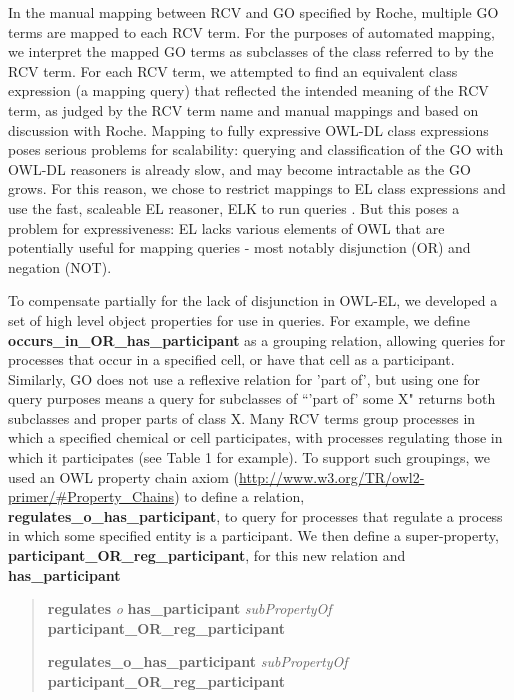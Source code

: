 \documentclass[runningheads,a4paper]{llncs}
\begin{document}
{{In the manual mapping between RCV and \ac{GO} specified by Roche, multiple \ac{GO} terms are mapped to each RCV term. For the purposes of automated mapping, we interpret the mapped \ac{GO} terms as subclasses of the class referred to by the RCV term. For each RCV term, we attempted to find an equivalent class expression (a mapping query) that reflected the intended meaning of the RCV term, as judged by the RCV term name and manual mappings and based on discussion with Roche.
%
Mapping to fully expressive OWL-DL class expressions poses serious problems for scalability: querying and classification of the \ac{GO} with OWL-DL reasoners is already slow, and may become intractable as the \ac{GO} grows.  For this reason, we chose to restrict mappings to EL class expressions and use the fast, scaleable EL reasoner, ELK to run queries \cite{kazakov2012}. But this poses a problem for expressiveness: EL lacks various elements of OWL that are potentially useful for mapping queries - most notably disjunction (OR) and negation (NOT).  

To compensate partially for the lack of disjunction in OWL-EL, we developed a set of high level object properties for use in queries. For example, we define \textbf{occurs\_in\_OR\_has\_participant} as a grouping relation, allowing queries for processes that occur in a specified cell, or have that cell as a participant. Similarly, \ac{GO} does not use a reflexive relation for 'part of', but using one for query purposes means a query for subclasses of  ``'part of' some X" returns both subclasses and proper parts of class X.
%
Many RCV terms group processes in which a specified chemical or cell participates, with processes regulating those in which it participates (see Table 1 for example). To support such groupings, we used an OWL property chain axiom (\url{http://www.w3.org/TR/owl2-primer/#Property_Chains}) to define a relation, \textbf{regulates\_o\_has\_participant}, to query for processes that regulate a process in which some specified entity is a participant. We then define a super-property, \textbf{participant\_OR\_reg\_participant}, for this new relation and \textbf{has\_participant}

\begin{quote} %
\textbf{regulates} \textit{o} \textbf{has\_participant} \textit{subPropertyOf} \textbf{participant\_OR\_reg\_participant}

\textbf{regulates\_o\_has\_participant} \textit{subPropertyOf} \textbf{participant\_OR\_reg\_participant}


\end{quote}}}
\end{document}
